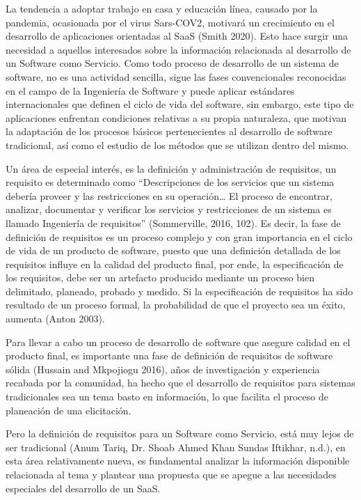 \documentclass{article}
\begin{document}
La tendencia a adoptar trabajo en casa y educación línea, causado por la pandemia, ocasionada por el virus Sars-COV2, motivará un crecimiento en el desarrollo de aplicaciones orientadas al SaaS (Smith 2020). Esto hace 
surgir una necesidad a aquellos interesados sobre la información relacionada al desarrollo de un Software como Servicio.
Como todo proceso de desarrollo de un sistema de software, no es una actividad sencilla, sigue las fases convencionales reconocidas en el campo de la Ingeniería de Software y puede aplicar estándares internacionales 
que definen el ciclo de vida del software, sin embargo, este tipo de aplicaciones enfrentan condiciones relativas a su propia naturaleza, que motivan la adaptación de los procesos básicos pertenecientes al desarrollo de software 
tradicional, así como el estudio de los métodos que se utilizan dentro del mismo.


Un área de especial interés, es la definición y administración de requisitos, un requisito es determinado como “Descripciones de los servicios que un sistema debería proveer y las restricciones en su operación… El proceso de encontrar, analizar, 
documentar y verificar los servicios y restricciones de un sistema es llamado Ingeniería de requisitos” (Sommerville, 2016, 102). Es decir, la fase de definición de requisitos es un proceso complejo y con gran importancia en el ciclo 
de vida de un producto de software, puesto que una definición detallada de los requisitos influye en la calidad del producto final, por ende, la especificación de los requisitos, debe ser un artefacto producido mediante un 
proceso bien delimitado, planeado, probado y medido. Si la especificación de requisitos ha sido resultado de un proceso formal, la probabilidad de que el proyecto sea un éxito, aumenta (Anton 2003).

Para llevar a cabo un proceso de desarrollo de software que asegure calidad en el producto final, es importante una fase de definición de requisitos de software sólida (Hussain and Mkpojiogu 2016), años de investigación y 
experiencia recabada por la comunidad, ha hecho que el desarrollo de requisitos para sistemas tradicionales sea un tema basto en información, lo que facilita el proceso de planeación de una elicitación.

Pero la definición de requisitos para un Software como Servicio, está muy lejos de ser tradicional (Anum Tariq, Dr. Shoab Ahmed Khan Sundas Iftikhar, n.d.), en esta área relativamente nueva, es fundamental analizar la 
información disponible relacionada al tema y plantear una propuesta que se apegue a las necesidades especiales del desarrollo de un SaaS. 
\end{document}
